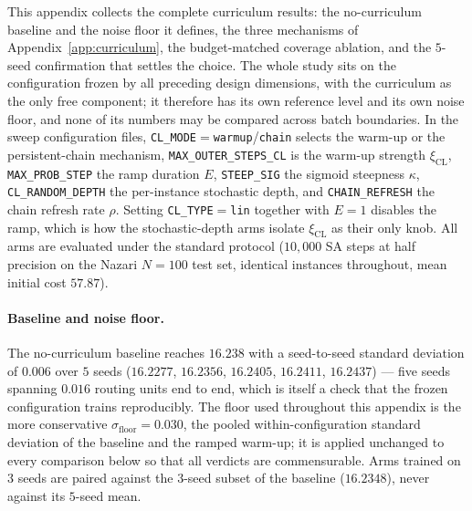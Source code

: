 \documentclass[letterpaper]{article} %
\begin{document}
This appendix collects the complete curriculum results: the no-curriculum baseline and the noise floor it defines, the three mechanisms of Appendix~\ref{app:curriculum}, the budget-matched coverage ablation, and the $5$-seed confirmation that settles the choice. The whole study sits on the configuration frozen by all preceding design dimensions, with the curriculum as the only free component; it therefore has its own reference level and its own noise floor, and none of its numbers may be compared across batch boundaries. In the sweep configuration files, \texttt{CL\_MODE}$=$\texttt{warmup}/\texttt{chain} selects the warm-up or the persistent-chain mechanism, \texttt{MAX\_OUTER\_STEPS\_CL} is the warm-up strength $\xi_{\mathrm{CL}}$, \texttt{MAX\_PROB\_STEP} the ramp duration $E$, \texttt{STEEP\_SIG} the sigmoid steepness $\kappa$, \texttt{CL\_RANDOM\_DEPTH} the per-instance stochastic depth, and \texttt{CHAIN\_REFRESH} the chain refresh rate $\rho$. Setting \texttt{CL\_TYPE}$=$\texttt{lin} together with $E = 1$ disables the ramp, which is how the stochastic-depth arms isolate $\xi_{\mathrm{CL}}$ as their only knob. All arms are evaluated under the standard protocol ($10{,}000$ SA steps at half precision on the Nazari $N = 100$ test set, identical instances throughout, mean initial cost $57.87$).

\paragraph{Baseline and noise floor.}
The no-curriculum baseline reaches $16.238$ with a seed-to-seed standard deviation of $0.006$ over $5$ seeds ($16.2277$, $16.2356$, $16.2405$, $16.2411$, $16.2437$) --- five seeds spanning $0.016$ routing units end to end, which is itself a check that the frozen configuration trains reproducibly. The floor used throughout this appendix is the more conservative $\sigma_{\mathrm{floor}} = 0.030$, the pooled within-configuration standard deviation of the baseline and the ramped warm-up; it is applied unchanged to every comparison below so that all verdicts are commensurable. Arms trained on $3$ seeds are paired against the $3$-seed subset of the baseline ($16.2348$), never against its $5$-seed mean.
\end{document}
